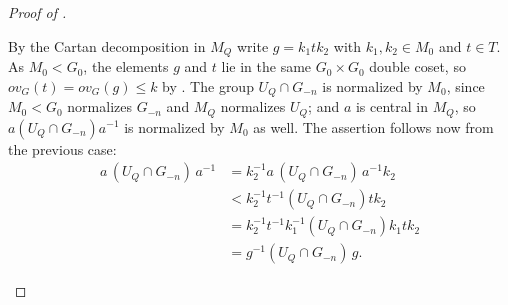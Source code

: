 \documentclass[12pt,a4paper]{amsart}%
\newcommand{\EitanE}[1]{{{#1}}}
\begin{document}
\begin{proof}[Proof of ]
{\begin{enumerate}[{Case} 1.]
    By the Cartan decomposition in $M_Q$ write $g=k_1tk_2$ with $k_1,k_2\in M_0$ and $t\in T$. As
$M_0<G_0$, the elements $g$ and $t$ lie in the same $G_0\times G_0$ double coset, so
$ov_G(t)=ov_G(g)\leq k$ by . The group $U_Q\cap G_{-n}$ is normalized by $M_0$, since $M_0<G_0$ normalizes
$G_{-n}$ and $M_Q$ normalizes $U_Q$; and $a$ is central in $M_Q$, so $a(U_Q\cap G_{-n})a^{-1}$ is
normalized by $M_0$ as well. The as\EitanE{s}ertion follows now from the \EitanE{previous} case:
\begin{align*}
a\,(U_Q\cap G_{-n})\,a^{-1}
&=
k_2^{-1} a\,(U_Q\cap G_{-n})\,a^{-1} k_2 \\
&<
k_2^{-1} t^{-1} (U_Q\cap G_{-n}) t k_2 \\
&= k_2^{-1} t^{-1} k_1^{-1}(U_Q\cap G_{-n})k_1 t k_2 \\
&=
g^{-1}(U_Q\cap G_{-n})\,g .
\end{align*}
\end{enumerate}
}

\end{proof}
\end{document}
